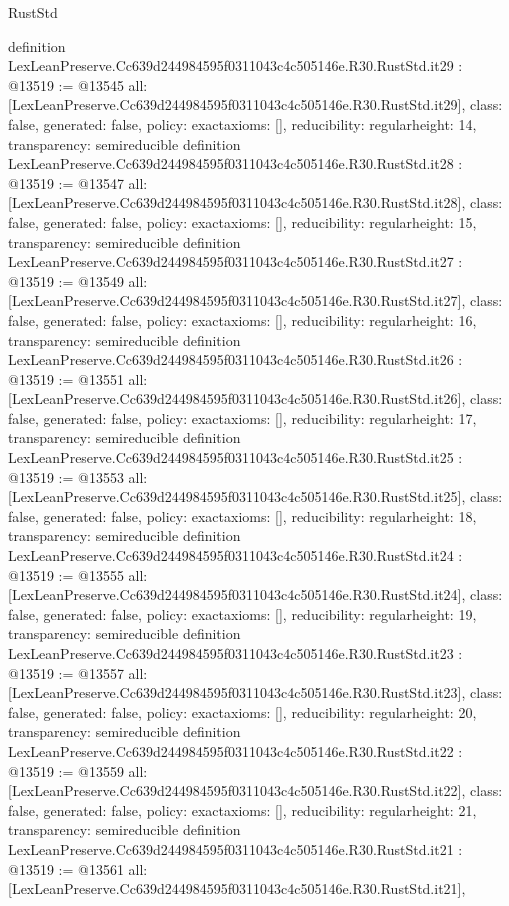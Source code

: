 \begin{lexlean}{RustStd}
\begin{coremodule}
{}
definition LexLeanPreserve.Cc639d244984595f0311043c4c505146e.R30.RustStd.it29 : @13519 := @13545 {
  all: [LexLeanPreserve.Cc639d244984595f0311043c4c505146e.R30.RustStd.it29],
  class: false,
  generated: false,
  policy: exact{axioms: []},
  reducibility: regular{height: 14},
  transparency: semireducible
}
definition LexLeanPreserve.Cc639d244984595f0311043c4c505146e.R30.RustStd.it28 : @13519 := @13547 {
  all: [LexLeanPreserve.Cc639d244984595f0311043c4c505146e.R30.RustStd.it28],
  class: false,
  generated: false,
  policy: exact{axioms: []},
  reducibility: regular{height: 15},
  transparency: semireducible
}
definition LexLeanPreserve.Cc639d244984595f0311043c4c505146e.R30.RustStd.it27 : @13519 := @13549 {
  all: [LexLeanPreserve.Cc639d244984595f0311043c4c505146e.R30.RustStd.it27],
  class: false,
  generated: false,
  policy: exact{axioms: []},
  reducibility: regular{height: 16},
  transparency: semireducible
}
definition LexLeanPreserve.Cc639d244984595f0311043c4c505146e.R30.RustStd.it26 : @13519 := @13551 {
  all: [LexLeanPreserve.Cc639d244984595f0311043c4c505146e.R30.RustStd.it26],
  class: false,
  generated: false,
  policy: exact{axioms: []},
  reducibility: regular{height: 17},
  transparency: semireducible
}
definition LexLeanPreserve.Cc639d244984595f0311043c4c505146e.R30.RustStd.it25 : @13519 := @13553 {
  all: [LexLeanPreserve.Cc639d244984595f0311043c4c505146e.R30.RustStd.it25],
  class: false,
  generated: false,
  policy: exact{axioms: []},
  reducibility: regular{height: 18},
  transparency: semireducible
}
definition LexLeanPreserve.Cc639d244984595f0311043c4c505146e.R30.RustStd.it24 : @13519 := @13555 {
  all: [LexLeanPreserve.Cc639d244984595f0311043c4c505146e.R30.RustStd.it24],
  class: false,
  generated: false,
  policy: exact{axioms: []},
  reducibility: regular{height: 19},
  transparency: semireducible
}
definition LexLeanPreserve.Cc639d244984595f0311043c4c505146e.R30.RustStd.it23 : @13519 := @13557 {
  all: [LexLeanPreserve.Cc639d244984595f0311043c4c505146e.R30.RustStd.it23],
  class: false,
  generated: false,
  policy: exact{axioms: []},
  reducibility: regular{height: 20},
  transparency: semireducible
}
definition LexLeanPreserve.Cc639d244984595f0311043c4c505146e.R30.RustStd.it22 : @13519 := @13559 {
  all: [LexLeanPreserve.Cc639d244984595f0311043c4c505146e.R30.RustStd.it22],
  class: false,
  generated: false,
  policy: exact{axioms: []},
  reducibility: regular{height: 21},
  transparency: semireducible
}
definition LexLeanPreserve.Cc639d244984595f0311043c4c505146e.R30.RustStd.it21 : @13519 := @13561 {
  all: [LexLeanPreserve.Cc639d244984595f0311043c4c505146e.R30.RustStd.it21],
}
\end{coremodule}
\end{lexlean}
